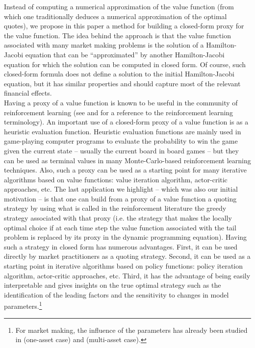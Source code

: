 \documentclass[preprint, 3p]{elsarticle}
\newcommand{\1}{{\chi}}
\begin{document}
Instead of computing a numerical approximation of the value function (from which one traditionally deduces a numerical approximation of the optimal quotes), we propose in this paper a method for building a closed-form proxy for the value function. The idea behind the approach is that the value function associated with many market making problems is the solution of a Hamilton-Jacobi equation that can be ``approximated'' by another Hamilton-Jacobi equation for which the solution can be computed in closed form. Of course,  such closed-form formula does not define a solution to the initial Hamilton-Jacobi equation, but it has similar properties and should capture most of the relevant financial effects.\\

Having a proxy of a value function is known to be useful in the community of reinforcement learning (see \cite{sutton} and \cite{cs} for a reference to the reinforcement learning terminology). An important use of a closed-form proxy of a value function is as a heuristic evaluation function. Heuristic evaluation functions are mainly used in game-playing computer programs to evaluate the probability to win the game given the current state -- usually the current board in board games -- but they can be used as terminal values in many Monte-Carlo-based reinforcement learning techniques. Also, such a proxy can be used as a starting point for many iterative algorithms based on value functions: value iteration algorithm, actor-critic approaches, etc. The last application we highlight -- which was also our initial motivation -- is that one can build from a proxy of a value function a quoting strategy by using what is called in the reinforcement literature the greedy strategy associated with that proxy (i.e. the strategy that makes the locally optimal choice if at each time step the value function associated with the tail problem is replaced by its proxy in the dynamic programming equation). Having such a strategy in closed form has numerous advantages. First, it can be used directly by market practitioners as a quoting strategy. Second, it can be used as a starting point in iterative algorithms based on policy functions: policy iteration algorithm, actor-critic approaches, etc. Third, it has the advantage of being easily interpretable and gives insights on the true optimal strategy such as the identification of the leading factors and the sensitivity to changes in model parameters.\footnote{For market making, the influence of the parameters has already been studied in \cite{gueant2013dealing} (one-asset case) and \cite{gueant2017optimal} (multi-asset case).}\\
\end{document}
